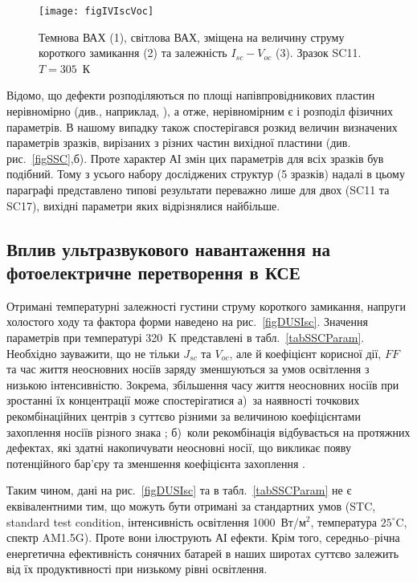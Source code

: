 \begin{figure}
\center
\texttt{[image: figIVIscVoc]}%
\caption{\label{figIVIscVoc}
Темнова ВАХ (1),
світлова ВАХ, зміщена на величину струму короткого замикання (2)
та залежність $I_{sc}-V_{oc}$ (3).
Зразок SC11.
$T=305$~К
}%
\end{figure}

Відомо, що дефекти розподіляються по площі напівпровідникових пластин нерівномірно (див., наприклад, \cite{Oxide:Chen,Oxide_Schon}),
а отже, нерівномірним є і розподіл фізичних параметрів.
В нашому випадку також спостерігався розкид величин визначених параметрів зразків, вирізаних з різних частин вихідної пластини (див. рис.~\ref{figSSC},б).
Проте характер АІ змін цих параметрів для всіх зразків був подібний.
Тому з усього набору досліджених структур (5 зразків) надалі в цьому параграфі представлено типові результати переважно лише для двох (SC11 та SC17),
вихідні параметри яких відрізнялися найбільше.



\subsection{Вплив ультразвукового навантаження на фотоелектричне перетворення в КСЕ}

Отримані температурні залежності густини струму короткого замикання, напруги холостого ходу та фактора форми наведено на рис.~\ref{figDUSIsc}.
Значення параметрів при температурі 320~K представлені в табл.~\ref{tabSSCParam}.
Необхідно зауважити, що не тільки $J_{sc}$ та $V_{oc}$, але й коефіцієнт корисної дії, $F\!F$ та час життя неосновних носіїв
заряду зменшуються за умов освітлення з низькою інтенсивністю\cite{LI:Ruhle,LI:Reich,LI:lifetime}.
Зокрема, збільшення часу життя неосновних носіїв при зростанні їх концентрації може спостерігатися
а)~за наявності точкових рекомбінаційних центрів з суттєво різними за величиною коефіцієнтами
захоплення носіїв різного знака \cite{Breitenstein2013,TauOnIph};
б)~коли рекомбінація відбувається на протяжних дефектах, які здатні накопичувати
неосновні носії, що викликає появу потенційного бар'єру та зменшення коефіцієнта захоплення \cite{Robinson1995,Schroter1995}.

Таким чином, дані на рис.~\ref{figDUSIsc} та в табл.~\ref{tabSSCParam} не є еквівалентними тим, що
можуть бути отримані за стандартних умов (STC, standard test condition, інтенсивність освітлення 1000~Вт/м$^2$,
температура $25^{\circ}$C, спектр AM1.5G).
Проте вони ілюструють АІ ефекти.
Крім того, середньо--річна енергетична ефективність сонячних батарей в наших широтах суттєво залежить від
їх продуктивності при низькому рівні освітлення.


